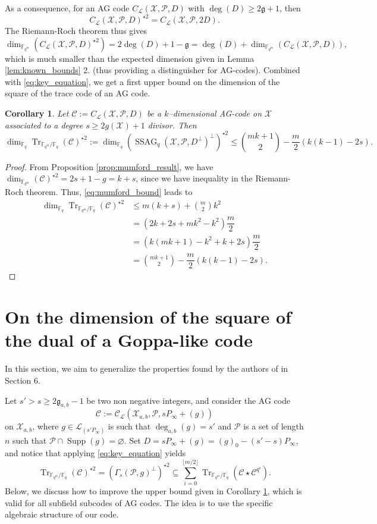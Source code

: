 \documentclass[a4paper]{article}
\newtheorem{coro}[thm]{Corollary}
\theoremstyle{definition}
\theoremstyle{remark}
\newcommand{\calP}{\mathcal{P}}
\newcommand{\calL}{\mathcal{L}}
\newcommand{\calC}{\mathcal{C}}
\newcommand{\calX}{\mathcal{X}}
\newcommand{\fqm}{\mathbb{F}_{q^m}}
\newcommand{\fq}{\mathbb{F}_{q}}
\newcommand{\Tr}[1]{\operatorname{Tr}_{\mathbb{F}_{q^m}/\fq}\left(#1\right)}
\newcommand{\Supp}{\operatorname{Supp}}
\newcommand{\ssag}[1]{\operatorname{SSAG}_{q}\left(#1\right)}
\newcommand{\degab}[1]{\deg_{a,b}\left(#1\right)}
\begin{document}
\noindent As a consequence, for an AG code  $C_{\calL}(\calX,\mathcal{P},D)$ with $\deg(D) \geq 2\mathfrak{g}+1$, then 
\[ C_{\calL}(\calX,\mathcal{P},D)^{\star2} = C_{\calL}(\calX,\calP,2D).\]
The Riemann-Roch theorem thus gives
\[ \dim_{\fqm}(C_{\calL}(\calX,\mathcal{P},D)^{\star2}) = 2\deg(D)+1-\mathfrak{g}= \deg(D) + \dim_{\fqm}(C_{\calL}(\calX,\mathcal{P},D)), \]
which is much smaller than the expected dimension given in Lemma \ref{lem:known_bounds} 2. (thus providing a distinguisher for AG-codes). Combined with \eqref{eq:key_equation}, we get a first upper bound on the dimension of the square of the trace code of an AG code.


\begin{coro} \label{coro:1st_bound_mumford}
Let $\mathcal{C} := C_{\calL}(\calX,\mathcal{P},D)$ be a $k$--dimensional AG-code on $\calX$ associated to a degree $s \geq 2g(\calX)+1$ divisor. Then
\[ \dim_{\fq}\Tr{\calC}^{\star2} := \dim_{\fq} (\ssag{\calX,\calP,D^{\perp}}^{\perp})^{\star2}  \leq \binom{mk+1}{2} - \dfrac{m}{2} (k(k-1)-2s).\]
\end{coro}


\begin{proof}
From Proposition \ref{prop:mumford_result}, we have $\dim_{\fqm}(\calC)^{\star2} = 2s+1-g = k+s$, since we have inequality in the Riemann-Roch theorem. Thus, \eqref{eq:mumford_bound} leads to
\begin{align*}
   \dim_{\fq}\Tr{\calC}^{\star2} &\leq m(k+s) + \binom{m}{2}k^2 \\
                                       &= (2k+2s+mk^2-k^2) \dfrac{m}{2} \\
                                       &= (k(mk+1)-k^2+k+2s) \dfrac{m}{2} \\
                                       &= \binom{mk+1}{2} - \dfrac{m}{2}(k(k-1)-2s) .
\end{align*}
\end{proof}


\section{On the dimension of the square of the dual of a Goppa-like code}

In this section, we aim to generalize the properties found by the authors of \cite{MT21} in Section 6. 

\noindent Let $s' > s \geq 2\mathfrak{g}_{a,b}-1$ be two non negative integers, and consider the AG code 
$$\calC := \calC_{\calL}(\calX_{a,b},\calP,sP_\infty+(g))$$
on $\calX_{a,b}$, where $g \in \calL_(s'P_\infty)$ is such that $\degab{g} = s'$ and $\calP$ is a set of length $n$ such that $\calP \cap \Supp(g) = \varnothing$. 
\noindent Set $D=sP_\infty+(g)=(g)_0-(s'-s)P_\infty$, and notice that applying \eqref{eq:key_equation} yields   
$$ \Tr{\calC}^{\star 2} = (\Gamma_s(\calP,g)^{\perp})^{\star2} \subseteq \sum\limits_{i=0}^{\lfloor{m/2} \rfloor} \Tr{\calC\star \calC^{q^i}}.$$ 
Below, we discuss how to improve the upper bound given in Corollary \ref{coro:1st_bound_mumford}, which is valid for all subfield subcodes of AG codes. The idea is to use the specific algebraic structure of our code.
\end{document}

